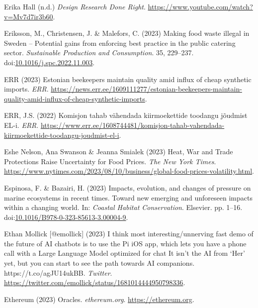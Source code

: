 \documentclass[
  letterpaper,
  DIV=11,
  numbers=noendperiod]{scrartcl}
\newlength{\cslhangindent}
\newenvironment{CSLReferences}[2] %
 {\begin{list}{}{%
  \setlength{\itemindent}{0pt}
  \setlength{\leftmargin}{0pt}
  \setlength{\parsep}{0pt}
  \ifodd #1
   \setlength{\leftmargin}{\cslhangindent}
   \setlength{\itemindent}{-1\cslhangindent}
  \fi
  \setlength{\itemsep}{#2\baselineskip}}}
 {\end{list}}
\begin{document}
\begin{CSLReferences}{0}{1}
Erika Hall (n.d.) \emph{Design {Research Done Right}}.
\url{https://www.youtube.com/watch?v=Mv7d7ir3b60}.

Eriksson, M., Christensen, J. \& Malefors, C. (2023) Making food waste
illegal in {Sweden} -- {Potential} gains from enforcing best practice in
the public catering sector. \emph{Sustainable Production and
Consumption}. 35, 229--237.
doi:\href{https://doi.org/10.1016/j.spc.2022.11.003}{10.1016/j.spc.2022.11.003}.

ERR (2023) Estonian beekeepers maintain quality amid influx of cheap
synthetic imports. \emph{ERR}.
\url{https://news.err.ee/1609111277/estonian-beekeepers-maintain-quality-amid-influx-of-cheap-synthetic-imports}.

ERR, J.S. (2022) {Komisjon tahab v{ä}hendada kiirmoekettide toodangu
j{õ}udmist EL-i}. \emph{ERR}.
\url{https://www.err.ee/1608744481/komisjon-tahab-vahendada-kiirmoekettide-toodangu-joudmist-el-i}.

Eshe Nelson, Ana Swanson \& Jeanna Smialek (2023) Heat, {War} and {Trade
Protections Raise Uncertainty} for {Food Prices}. \emph{The New York
Times}.
\url{https://www.nytimes.com/2023/08/10/business/global-food-prices-volatility.html}.

Espinosa, F. \& Bazairi, H. (2023) Impacts, evolution, and changes of
pressure on marine ecosystems in recent times. {Toward} new emerging and
unforeseen impacts within a changing world. In: \emph{Coastal {Habitat
Conservation}}. Elsevier. pp. 1--16.
doi:\href{https://doi.org/10.1016/B978-0-323-85613-3.00004-9}{10.1016/B978-0-323-85613-3.00004-9}.

Ethan Mollick {[}@emollick{]} (2023) I think most interesting/unnerving
fast demo of the future of {AI} chatbots is to use the {Pi iOS} app,
which lets you have a phone call with a {Large Language Model} optimized
for chat {It} isn't the {AI} from {`{Her}'} yet, but you can start to
see the path towards {AI} companions. {https://t.co/agJU14ukBB}.
\emph{Twitter}.
\url{https://twitter.com/emollick/status/1681014444950798336}.

Ethereum (2023) Oracles. \emph{ethereum.org}.
\url{https://ethereum.org}.


\end{CSLReferences}
\end{document}
